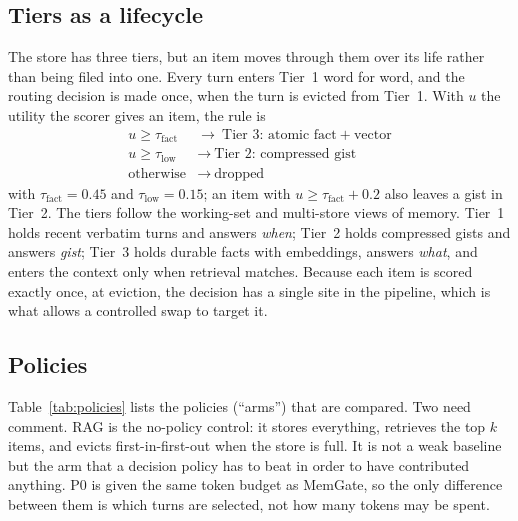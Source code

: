 \subsection{Tiers as a lifecycle}
The store has three tiers, but an item moves through them over its life
rather than being filed into one. Every turn enters Tier~1 word for word, and
the routing decision is made once, when the turn is evicted from Tier~1. With
$u$ the utility the scorer gives an item, the rule is
\begin{equation}
\label{eq:route}
\begin{array}{ll}
u \geq \tau_{\text{fact}} & \rightarrow\ \text{Tier 3: atomic fact}+\text{vector}\\
u \geq \tau_{\text{low}}  & \rightarrow\ \text{Tier 2: compressed gist}\\
\text{otherwise}          & \rightarrow\ \text{dropped}
\end{array}
\end{equation}
with $\tau_{\text{fact}}=0.45$ and $\tau_{\text{low}}=0.15$; an item with
$u\ge\tau_{\text{fact}}+0.2$ also leaves a gist in Tier~2. The tiers follow
the working-set \cite{denning1968workingset} and multi-store
\cite{atkinson1968memory} views of memory. Tier~1 holds recent verbatim turns
and answers \emph{when}; Tier~2 holds compressed gists and answers
\emph{gist}; Tier~3 holds durable facts with embeddings, answers \emph{what},
and enters the context only when retrieval matches. Because each item is
scored exactly once, at eviction, the decision has a single site in the
pipeline, which is what allows a controlled swap to target it.

\subsection{Policies}
Table~\ref{tab:policies} lists the policies (``arms'') that are compared. Two
need comment. RAG is the no-policy control: it stores everything, retrieves
the top $k$ items, and evicts first-in-first-out when the store is full. It is
not a weak baseline but the arm that a decision policy has to beat in order
to have contributed anything. P0 is given the same token budget as MemGate,
so the only difference between them is which turns are selected, not how many
tokens may be spent.

